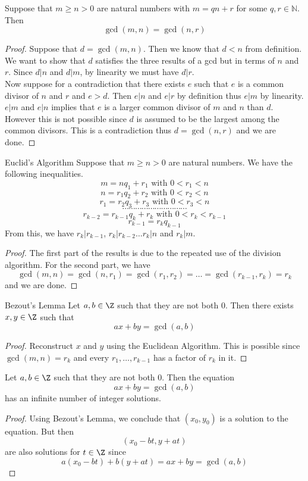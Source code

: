 \documentclass[a4paper]{article}
\begin{document}
\begin{prp}{}{} Suppose that $m\geq n>0$ are natural numbers with $m=qn+r$ for some $q,r\in\mathbb{N}$. Then $$\gcd{(m,n)}=\gcd{(n,r)}$$ 
\begin{proof}
Suppose that $d=\gcd(m,n)$. Then we know that $d<n$ from definition. We want to show that $d$ satisfies the three results of a gcd but in terms of $n$ and $r$. Since $d|n$ and $d|m$, by linearity we must have $d|r$. \\
Now suppose for a contradiction that there exists $e$ such that $e$ is a common divisor of $n$ and $r$ and $e>d$. Then $e|n$ and $e|r$ by definition thus $e|m$ by linearity. $e|m$ and $e|n$ implies that $e$ is a larger common divisor of $m$ and $n$ than $d$. However this is not possible since $d$ is assumed to be the largest among the common divisors. This is a contradiction thus $d=\gcd(n,r)$ and we are done. 
\end{proof}
\end{prp}

\begin{thm}{Euclid's Algorithm}{} Suppose that $m\geq n>0$ are natural numbers. We have the following inequalities. 
$$m=nq_1+r_1\text{ with }0<r_1<n$$
$$n=r_1q_2+r_2\text{ with }0<r_2<n$$
$$r_1=r_2q_3+r_3\text{ with }0<r_3<n$$
$$\cdots\cdots\cdots\cdots\cdots\cdots\cdots\cdots\cdots\cdots$$
$$r_{k-2}=r_{k-1}q_k+r_k\text{ with }0<r_k<r_{k-1}$$
$$r_{k-1}=r_kq_{k-1}$$
From this, we have $r_k|r_{k-1}$, $r_k|r_{k-2}\dots r_k|n$ and $r_k|m$. 
\begin{proof} The first part of the results is due to the repeated use of the division algorithm. For the second part, we have $$\gcd(m,n)=\gcd(n,r_1)=\gcd(r_1,r_2)=\dots=\gcd(r_{k-1},r_k)=r_k$$ and we are done. 
\end{proof}
\end{thm}

\begin{lmm}{Bezout's Lemma}{} Let $a,b\in\Z$ such that they are not both $0$. Then there exists $x,y\in\Z$ such that $$ax+by=\gcd(a,b)$$ 
\begin{proof} Reconstruct $x$ and $y$ using the Euclidean Algorithm. This is possible since $\gcd(m,n)=r_k$ and every $r_1,\dots,r_{k-1}$ has a factor of $r_k$ in it. 
\end{proof}
\end{lmm}

\begin{lmm}{}{} Let $a,b\in\Z$ such that they are not both $0$. Then the equation $$ax+by=\gcd(a,b)$$ has an infinite number of integer solutions. 
\begin{proof} Using Bezout's Lemma, we conclude that $(x_0,y_0)$ is a solution to the equation. But then $$(x_0-bt,y+at)$$ are also solutions for $t\in\Z$ since $$a(x_0-bt)+b(y+at)=ax+by=\gcd(a,b)$$
\end{proof}
\end{lmm}
\end{document}
